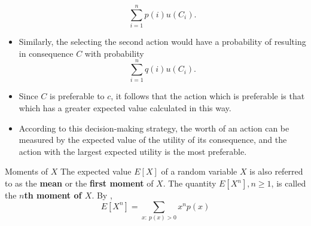 \begin{changebar}
\begin{example}[Utility]
\begin{itemize}
\[                \sum^n_{i = 1} p(i)u(C_i).
            \]
            \item Similarly, the selecting the second action would have a probability of resulting in consequence $C$ with probability \[
                \sum^n_{i = 1} q(i)u(C_i).    
            \]
            \item Since $C$ is preferable to $c$, it follows that the action which is preferable is that which has a greater expected value calculated in this way.
            \item According to this decision-making strategy, the worth of an action can be measured by the expected value of the utility of its consequence, and the action with the largest expected utility is the most preferable.
        \end{itemize}
    \end{example}
\end{changebar}
\begin{bdef}{Moments of $X$}\label{moments}
    The expected value $E\left[ X \right]$ of a random variable $X$ is also referred to as the \textbf{mean} or the \textbf{first moment} of $X$. The quantity $E\left[ X^n \right], n \geq 1$, is called the \textbf{$n$th moment of $X$}. By , \[
        E\left[ X^n \right] = \sum_{x:\: p(x) > 0} x^np(x)
    \]
\end{bdef}

\pagebreak
